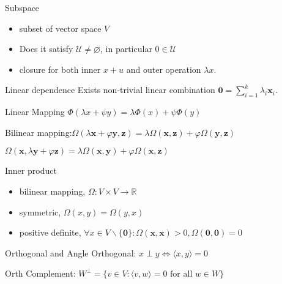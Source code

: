 \documentclass[UTF8,a4paper]{article}
\begin{document}
\begin{multicols}{3}
\begin{cheatsheetblock}{Subspace}
    \begin{itemize}
        \item subset of vector space $V$
        \item Does it satisfy $\mathcal{U} \neq \varnothing$, in particular $0 \in \mathcal{U}$
        \item closure for both inner $x + u$ and outer operation $\lambda x$.
    \end{itemize}
\end{cheatsheetblock}

\begin{cheatsheetblock}{Linear dependence}
    Exists non-trivial linear combination $\mathbf{0}=\sum_{i=1}^k \lambda_i \boldsymbol{x}_i$.
\end{cheatsheetblock}

\begin{cheatsheetblock}{Linear Mapping}
    $\Phi(\lambda x+\psi y)=\lambda \Phi(x)+\psi \Phi(y)$

    Bilinear mapping:\hfill $\Omega(\lambda \boldsymbol{x}+\varphi \boldsymbol{y}, \boldsymbol{z})=\lambda \Omega(\boldsymbol{x}, \boldsymbol{z})+\varphi \Omega(\boldsymbol{y}, \boldsymbol{z})$

    \hfill$\Omega(\boldsymbol{x}, \lambda \boldsymbol{y}+\varphi \boldsymbol{z})=\lambda \Omega(\boldsymbol{x}, \boldsymbol{y})+\varphi \Omega(\boldsymbol{x}, \boldsymbol{z})$
\end{cheatsheetblock}

\begin{cheatsheetblock}{Inner product}
    \begin{itemize}
        \item bilinear mapping, \hfill $\Omega: V \times V \rightarrow \mathbb{R}$
        \item symmetric, \hfill $\Omega(x, y)=\Omega(y, x)$
        \item positive definite, \hfill $\forall x \in V \backslash\{\mathbf{0}\}: \Omega(\boldsymbol{x}, \boldsymbol{x})>0, \Omega(\mathbf{0}, \mathbf{0})=0$
    \end{itemize}
\end{cheatsheetblock}

\begin{cheatsheetblock}{Orthogonal and Angle}
    Orthogonal: \hfill $x \perp y \Leftrightarrow \langle x, y\rangle=0$

    Orth Complement: \hfill $W^\perp = \{ v \in V : \langle v, w \rangle = 0 \text{ for all } w \in W \}$


\end{cheatsheetblock}
\end{multicols}
\end{document}
